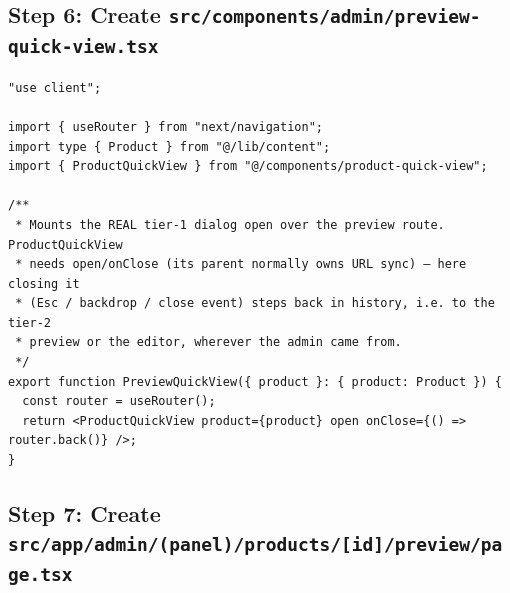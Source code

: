 \documentclass[11pt,a4paper]{article}
\begin{document}
\subsection*{Step 6: Create \texttt{src/components/admin/preview-quick-view.tsx}}

\begin{lstlisting}
"use client";

import { useRouter } from "next/navigation";
import type { Product } from "@/lib/content";
import { ProductQuickView } from "@/components/product-quick-view";

/**
 * Mounts the REAL tier-1 dialog open over the preview route. ProductQuickView
 * needs open/onClose (its parent normally owns URL sync) — here closing it
 * (Esc / backdrop / close event) steps back in history, i.e. to the tier-2
 * preview or the editor, wherever the admin came from.
 */
export function PreviewQuickView({ product }: { product: Product }) {
  const router = useRouter();
  return <ProductQuickView product={product} open onClose={() => router.back()} />;
}
\end{lstlisting}

\subsection*{Step 7: Create \texttt{src/app/admin/(panel)/products/[id]/preview/page.tsx}}
\end{document}
